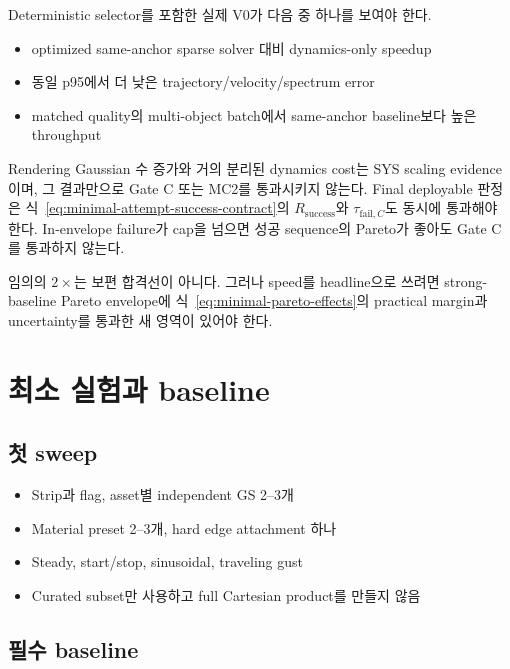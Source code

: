 \documentclass[11pt]{article}
\begin{document}
Deterministic selector를 포함한 실제 V0가 다음 중 하나를 보여야 한다.

\begin{itemize}
  \item optimized same-anchor sparse solver 대비 dynamics-only speedup
  \item 동일 p95에서 더 낮은 trajectory/velocity/spectrum error
  \item matched quality의 multi-object batch에서 same-anchor baseline보다 높은 throughput
\end{itemize}

Rendering Gaussian 수 증가와 거의 분리된 dynamics cost는 SYS scaling evidence이며,
그 결과만으로 Gate C 또는 MC2를 통과시키지 않는다.
Final deployable 판정은 식~\eqref{eq:minimal-attempt-success-contract}의
\(R_{\mathrm{success}}\)와 \(\tau_{\mathrm{fail},C}\)도 동시에 통과해야 한다.
In-envelope failure가 cap을 넘으면 성공 sequence의 Pareto가 좋아도 Gate C를 통과하지 않는다.

임의의 \(2\times\)는 보편 합격선이 아니다.
그러나 speed를 headline으로 쓰려면 strong-baseline Pareto envelope에
식~\eqref{eq:minimal-pareto-effects}의 practical margin과 uncertainty를 통과한 새 영역이 있어야 한다.

\section{최소 실험과 baseline}

\subsection{첫 sweep}

\begin{itemize}
  \item Strip과 flag, asset별 independent GS 2--3개
  \item Material preset 2--3개, hard edge attachment 하나
  \item Steady, start/stop, sinusoidal, traveling gust
  \item Curated subset만 사용하고 full Cartesian product를 만들지 않음
\end{itemize}

\subsection{필수 baseline}
\end{document}
